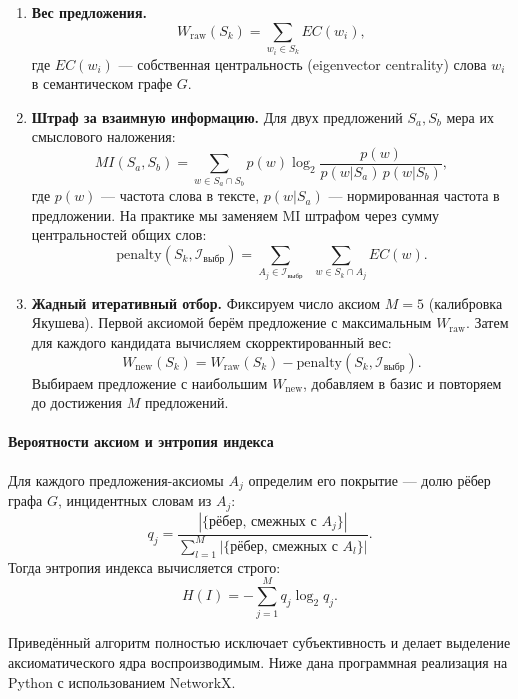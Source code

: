 \documentclass[12pt,a4paper]{article}
\begin{document}
	\begin{enumerate}
		\item \textbf{Вес предложения.}
		\[
		W_{\text{raw}}(S_k) = \sum_{w_i \in S_k} EC(w_i),
		\]
		где \(EC(w_i)\) — собственная центральность (eigenvector centrality) слова \(w_i\) в семантическом графе \(G\).
		
		\item \textbf{Штраф за взаимную информацию.}
		Для двух предложений \(S_a, S_b\) мера их смыслового наложения:
		\[
		MI(S_a, S_b) = \sum_{w \in S_a \cap S_b} p(w) \log_2 \frac{p(w)}{p(w|S_a)\, p(w|S_b)},
		\]
		где \(p(w)\) — частота слова в тексте, \(p(w|S_a)\) — нормированная частота в предложении. На практике мы заменяем MI штрафом через сумму центральностей общих слов:
		\[
		\text{penalty}(S_k, \mathcal{I}_{\text{выбр}}) = \sum_{A_j \in \mathcal{I}_{\text{выбр}}} \;\; \sum_{w \in S_k \cap A_j} EC(w).
		\]
		
		\item \textbf{Жадный итеративный отбор.}
		Фиксируем число аксиом \(M = 5\) (калибровка Якушева). Первой аксиомой берём предложение с максимальным \(W_{\text{raw}}\). Затем для каждого кандидата вычисляем скорректированный вес:
		\[
		W_{\text{new}}(S_k) = W_{\text{raw}}(S_k) - \text{penalty}(S_k, \mathcal{I}_{\text{выбр}}).
		\]
		Выбираем предложение с наибольшим \(W_{\text{new}}\), добавляем в базис и повторяем до достижения \(M\) предложений.
	\end{enumerate}
	
	\paragraph{Вероятности аксиом и энтропия индекса}
	Для каждого предложения-аксиомы \(A_j\) определим его покрытие — долю рёбер графа \(G\), инцидентных словам из \(A_j\):
	\[
	q_j = \frac{|\{\text{рёбер, смежных с } A_j\}|}{\sum_{l=1}^M |\{\text{рёбер, смежных с } A_l\}|}.
	\]
	Тогда энтропия индекса вычисляется строго:
	\[
	H(I) = -\sum_{j=1}^{M} q_j \log_2 q_j.
	\]
	
	Приведённый алгоритм полностью исключает субъективность и делает выделение аксиоматического ядра воспроизводимым. Ниже дана программная реализация на Python с использованием NetworkX.
	
\end{document}
